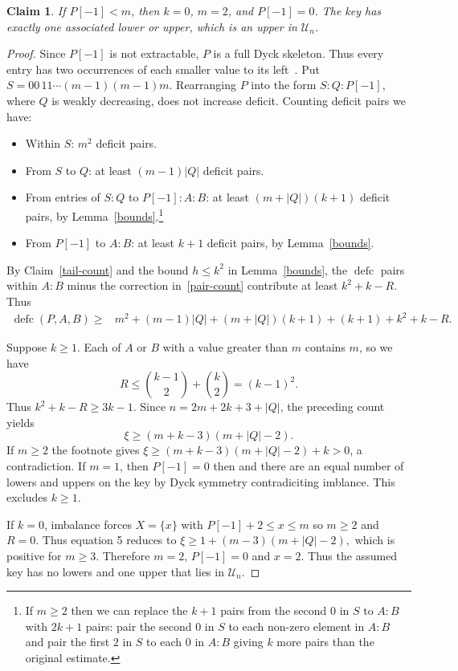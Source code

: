 \documentclass[11pt]{article}
\DeclareMathOperator{\defc}{defc}\DeclareMathOperator{\sym}{sym}
\newtheorem{claim}{Claim}
\begin{document}
\begin{claim}\label{below-maximum}
If $P[-1]<m$, then $k=0$, $m=2$, and $P[-1]=0$. The key has exactly one associated lower or upper, which is an upper in $\mathcal U_n$.
\end{claim}
\begin{proof}
Since $P[-1]$ is not extractable, $P$ is a full Dyck skeleton. Thus every entry has two occurrences of each smaller value to its left~\cite[Lemma~1.12]{H}. Put $
 S=00\,11\cdots(m-1)(m-1)m$. 
Rearranging $P$ into the form $S:Q:P[-1]$, where $Q$ is weakly decreasing, does not increase deficit. Counting deficit pairs we have:
\begin{itemize}
\item Within $S$: $m^2$ deficit pairs.
\item From $S$ to $Q$: at least $(m-1)|Q|$ deficit pairs.
\item From entries of $S:Q$ to $P[-1]:A:B$: at least $(m+|Q|)(k+1)$ deficit pairs, by Lemma~\ref{bounds}.\footnote{If $m \geq 2$ then we can replace the $k+1$ pairs from the second $0$ in $S$ to $A:B$ with $2k+1$ pairs: pair the second $0$ in $S$ to each non-zero element in $A:B$ and pair the first  $2$ in $S$ to each $0$ in $A:B$ giving $k$ more pairs than the original estimate.}
\item From $P[-1]$ to $A:B$: at least $k+1$ deficit pairs, by Lemma~\ref{bounds}.
\end{itemize}
By Claim~\ref{tail-count} and the bound $h\le k^2$ in Lemma~\ref{bounds}, the $\defc$ pairs within $A:B$ minus the correction in~\eqref{pair-count} contribute at least $k^2+k-R$. Thus 
\begin{equation}\label{below-count}
 \begin{aligned}
 \defc(P,A,B)\ge{}&m^2+(m-1)|Q|+(m+|Q|)(k+1)+(k+1)+k^2+k-R.
 \end{aligned}
\end{equation}

Suppose $k\ge1$. Each of $A$ or $B$ with a value greater than $m$ contains $m$, so we have
\[
 R\le\binom{k-1}{2}+\binom{k}{2}=(k-1)^2.
\]
Thus $k^2+k-R\ge3k-1$. Since $n=2m+2k+3+|Q|$, the preceding count yields
\begin{equation}\label{below-base}
 \xi\ge(m+k-3)(m+|Q|-2).
\end{equation}
If $m\ge2$ the footnote  gives $
 \xi\ge(m+k-3)(m+|Q|-2)+k>0$,
a contradiction. If $m=1$, then $P[-1]=0$ then and there are an equal number of lowers and uppers on the key by Dyck symmetry contradiciting imblance. This excludes $k\ge1$.

If $k=0$, imbalance forces $X=\{x\}$ with $
 P[-1]+2\le x\le m$ so $m\ge2$ and $R=0$. Thus equation 5 reduces to $
 \xi\ge1+(m-3)(m+|Q|-2),
$
which is positive for $m\ge3$. Therefore $m=2$, $P[-1]=0$ and $x=2$. Thus the assumed key has no lowers and one upper that lies in $\mathcal U_n$.
\end{proof}
\end{document}

